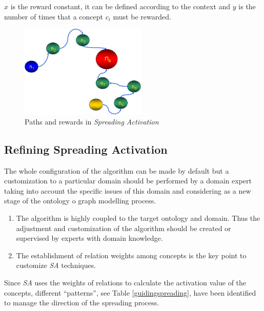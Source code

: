 \documentclass{llncs}
\begin{document}
$x$ is the reward constant, it can be defined according to the context and $y$
is the number of times that a concept $c_i$ must be rewarded.

\begin{figure}[h]
 \centering
    \includegraphics[width=6cm]{images/prize-sa}
    \caption{Paths and rewards in \textit{Spreading Activation}}
 \label{fig:prize-sa}
\end{figure}
  
  
\subsection{Refining Spreading Activation}
The whole configuration of the algorithm can be made by default but a customization
to a particular domain should be performed by a domain expert taking into account the
specific issues of this domain and considering as a new stage of the ontology o graph modelling process.

\begin{enumerate}
  \item The algorithm is highly coupled to the target ontology and domain. 
   Thus the adjustment and customization of the algorithm should be created or
  supervised by experts with domain knowledge. 
  \item The establishment of relation weights among concepts is
  the key point to customize \textit{SA} techniques. 
\end{enumerate}

Since \textit{SA} uses the weights of relations to calculate the activation
value of the concepts, different ``patterns'', see Table
\ref{guidingspreading}, have been identified to manage the direction of the spreading process.
\end{document}
